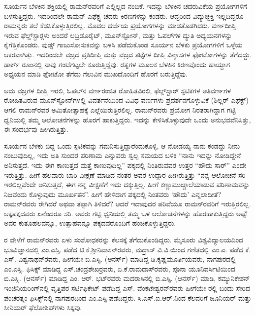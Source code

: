 ಸೂರ್ಯನ ಬೆಳಕಿನ ಶಕ್ತಿಯಲ್ಲಿ ರಾಮನ್‍ರವರಿಗೆ ಎಲ್ಲಿಲ್ಲದ ನಂಬಿಕೆ. ಇದನ್ನು ಬೆಳಕಿನ ಚದರುವಿಕೆಯ ಪ್ರಯೋಗಗಳಿಗೆ ಬಳಸುತ್ತಿದ್ದರು. ಇದರಿಂದಲೇ ರಾಮನ್ ಎಫೆಕ್ಟ್ನ ಚದರು ಕಿರಣಗಳನ್ನು ಕಂಡರು. ಆದ್ದರಿಂದ ವಿದ್ಯುಚ್ಛಕ್ತಿ ಇಲ್ಲದಿದ್ದರೂ ರಾಮನ್ನರು ತಲೆ ಕೆಡಸಿಕೊಳ್ಳುತ್ತಿರಲಿಲ್ಲ. ಮೊದಲ ದರ್ಜೆಯ ಪ್ರಯೋಗಗಳನ್ನು ಮಾಡತೊಡಗಿದರು. ವರ್ಣದೀಪ್ತಿ ಇರುವ ಫೆಲ್ಡ್‌ಸ್ಟಾರ್‍ಗಳು ಅಂದರೆ ಲಬ್ರಡೊರೈಟ್, ಮೂನ್‍ಸ್ಟೋನ್, ಮತ್ತು ಓಪಲ್‍ಗಳ ದ್ಯುತಿ ಅಧ್ಯಯನಗಳನ್ನು ಕೈಗೆತ್ತಿಕೊಂಡರು. ವುಡ್ಸ್ ಗಾಜುಸೋಸುಕವನ್ನು ಬಳಸಿ ಪಡೆದುಕೊಂಡ ಸೂರ್ಯನ ಬೆಳಕು ಪ್ರಯೋಗಗಳಿಗೆ ಒಳ್ಳೆಯ ಆಕರವಾಗಿತ್ತು. ಇದರಿಂದಲೇ ವಜ್ರದ ಪ್ರತಿದೀಪ್ತಿ ಮತ್ತು ವಜ್ರದ ತಟ್ಟೆಗಳ ದೀಪ್ತಿ ವಿನ್ಯಾಸಗಳ ಫೋಟೋಗಳನ್ನು ತೆಗೆದದ್ದು. ಡಾರ್ಕ್ ರೂಂನಲ್ಲಿ ನಾವು ಗಂಟೆಗಟ್ಟಲೇ ಕೂರುತ್ತಿದ್ದೆವು. ರತ್ನಗಳ ಮೂಲಕ ಬೆಳಕಿನ ಕಿರಣವೊಂದು ಹಾಯ್ದಾಗ ಅಧ್ಯಯನ ಮಾಡಿ ಫೋಟೋ ತೆಗೆದು ಗೆಲುವಿನ ಮುಖದೊಂದಿಗೆ ಹೊರಗೆ ಬರುತ್ತಿದ್ದೆವು.

ಅದು ವಜ್ರಗಳ ದೀಪ್ತಿ ಇರಲಿ, ಓಪಲ್‍ನ ವರ್ಣರಂಜಿತ ರೋಹಿತವಿರಲಿ, ಫೆಲ್ಡ್‌ಸ್ಟಾರ್ ಸ್ಫಟಿಕಗಳ ಅತಿವರ್ಣಗಳ ರೋಹಿತವಿರುವ ಮೂನ್‍ಸ್ಟೋನ್‍ಗಳಲ್ಲಿ ವಿವರ್ತನೆಯಿಂದ ವಿವಿಧ ವರ್ಣಗಳು ಪ್ರದರ್ಶನಗೊಳ್ಳುವಿಕೆ (ಶಿಲ್ಲರ್ ಎಫೆಕ್ಟ್) \enginline{-}ಆಗಲಿ ರಾಮನ್‍ರವರ ಅಮಿತೋತ್ಸಾಹಕ್ಕೆ ಎಲ್ಲೆಯಿರುತ್ತಿರಲಿಲ್ಲ. ರಾಮನ್‍ರವರು ಪ್ರಯೋಗ ನಿರತರಾಗಿದ್ದಾಗ ಗಟ್ಟಿ ಧ್ವನಿಯಲ್ಲಿ ತಮ್ಮ ಆಲೋಚನೆಗಳನ್ನು ಹೊರಗೆ ಹಾಕುತ್ತಿದ್ದರು. ಇದನ್ನು ಕೇಳಿಸಿಕೊಳ್ಳುವುದೇ ಒಂದು ಅನುಭವವೆನಿಸಿತ್ತು, ಈ ಸಂದರ್ಭವು ಹೀಗಿರುತ್ತಿತ್ತು.

ಸೂರ್ಯನ ಬೆಳಕು ಬಿದ್ದ ಒಂದು ಸ್ಫಟಿಕವನ್ನು ಗಮನಿಸುತ್ತಿದ್ದಾರೆಂದುಕೊಳ್ಳಿ, ಆ ನೋಡಯ್ಯ ನಾನು ಕಂಡದ್ದು ನೀನು ನಂಬುವುದಿಲ್ಲ, ಇದು ಅತಿ ಸುಂದರ ಪರಿಣಾಮ ಎನ್ನುವರು ಸ್ವಲ್ಪ ಸಮಯದ ಬಳಿಕ “ನಾನು ಇದನ್ನು ನೋಡಿದ್ದೇನೆ ಅನಿಸುತ್ತದೆ. ಇದು ಈಗ ಕಾಣುತ್ತದೆ ಮತ್ತೆ ಕಾಣುವುದಿಲ್ಲ” ಪಕ್ಕದಲ್ಲಿ ನಿಂತಿರುವವರ ಉತ್ತರ “ಹೌದು ಸಾರ್” ಎಂದೇ ಇರುತ್ತಿತ್ತು. ಹೀಗೆ ಹಲವಾರು ಬಾರಿ ವೀಕ್ಷಣೆ ಮಾಡಿದ ನಂತರ ಅವರ ಉದ್ಗಾರ ಹೀಗಿರುತ್ತಿತ್ತು \enginline{-} “ನನ್ನ ಆಲೋಚನೆ ಸರಿ ಇರಲಿಲ್ಲವೆಂದೇ ಅನಿಸುತ್ತದೆ, ಈಗ ನನ್ನ ವೀಕ್ಷಣೆಗೆ ಇದು ದಕ್ಕುತ್ತಿಲ್ಲ. ಹೀಗೆ ಕಣ್ಣುಮುಚ್ಚಾಲೆಯಾಡುವ ಪರಿಣಾಮವನ್ನು ನಿಜವೆಂದು ಕೊಳ್ಳುವುದು ಮೂರ್ಖತನ”. ಹೀಗೆ ಹೇಳಿದಾಗ ಪಕ್ಕದಲ್ಲಿ ನಿಂತವರು ‘ಹೌದು’ ಎನ್ನಲಾದೀತೆ? ರಾಮನ್‍ರವರು ರೇಗಿದರೆ ಅಥವಾ ತಪ್ಪಾಗಿ ತಿಳಿದರೆ? ಆದರೆ ಇದಾವುದರ ಪರಿವೆಯೂ ರಾಮನ್‍ರವರಿಗೆ ಇರುತ್ತಿರಲಿಲ್ಲ. ಅಕ್ಕಪಕ್ಕದವರು ಏನೆಂದರೂ ಸರಿ. ಅವರು ಗಟ್ಟಿ ಧ್ವನಿಯಲ್ಲಿ ತಮ್ಮ ಒಳ ಆಲೋಚನೆಗಳನ್ನು ಹೊರಹಾಕುತ್ತಿದ್ದರು ಅಷ್ಟೆ! ಅವರ ಕುತೂಹಲವನ್ನೂ, ಉತ್ಸಾಹವನ್ನೂ ಪಕ್ಕದವರೊಂದಿಗೆ ಹಂಚಿಕೊಳ್ಳುತ್ತಿದ್ದರು.

ರ ವೇಳೆಗೆ ರಾಮನ್‍ರವರು ಏಳು ಸಂಶೋಧಕರನ್ನು ಕೆಲಸಕ್ಕೆ ತೆಗೆದುಕೊಂಡಿದ್ದರು. ಮೈಸೂರು ವಿಶ್ವವಿದ್ಯಾಲಯದಿಂದ ಭೂವಿಜ್ಞಾನದಲ್ಲಿ ಎಂ.ಎಸ್ಸಿ. ಪಡೆದ ಟಿ.ಕೆ.ಶ‍್ರೀನಿವಾಸನ್‍ರವರು, ಮದ್ರಾಸ್ ವಿ.ವಿ.ಯಿಂದ ಗಣಿತದಲ್ಲಿ ಎಂ.ಎ. ಪಡೆದ ಕೆ. ಎಸ್. ವಿಶ್ವನಾಥನ್‍ರವರು, ಹೀಗೆಯೇ ಬಿ.ಎಸ್ಸಿ. (ಆನರ್ಸ್) ಮಾಡಿದ್ದ ಡಿ.ಕೃಷ್ಣಮೂರ್ತಿಯವರು, ನಾಗಪುರದಲ್ಲಿ ಎಂ.ಎಸ್ಸಿ. ಫಿಸಿಕ್ಸ್ ಮಾಡಿದ್ದ ಎಸ್.ಚಂದ್ರಶೇಖರ್‍ರವರು, ಏ.ಕೆ.ರಾಮದಾಸ್‍ರವರು, ಪೂನಾ ಯೂನಿವರ್ಸಿಟಿಯಿಂದ ಬಿ.ಎಸ್ಸಿ. (ಆನರ್ಸ್) ಮಾಡಿದ್ದ ಎಂ. ಆರ್. ಭಟ್‍ರವರು ಮದರಾಸಿನಲ್ಲಿ ಬಿ.ಎಸ್ಸಿ. (ಆನರ್ಸ್) ಮಾಡಿ, ಕಮ್ಯುನಿಕೇಶನ್ ಇಂಜಿನಿಯರಿಂಗ್‍ನಲ್ಲಿ ವೃತ್ತಿಪರ ಸರ್ಟಿಫಿಕೇಟ್ ಪಡೆದಿದ್ದ ಎಸ್. ವೆಂಕಟೇಶ್ವರನ್‍ರವರು ಹೀಗೆಯೇ ರಲ್ಲಿ ಬಂದು ಸೇರಿದ ಪಂಚರತ್ನಂ ಫಿಸಿಕ್ಸ್‌ನಲ್ಲಿ ನಾಗಪುರದಿಂದ ಎಂ.ಎಸ್ಸಿ ಪಡೆದಿದ್ದರು. ಸಿ.ಎಸ್.ಐ.ಆರ್.ನಿಂದ ಕೆಲವರಿಗೆ ಜೂನಿಯರ್ ಮತ್ತು ಸೀನಿಯರ್ ಫೆಲೋಶಿಪ್‍ಗಳು ಸಿಕ್ಕವು.

